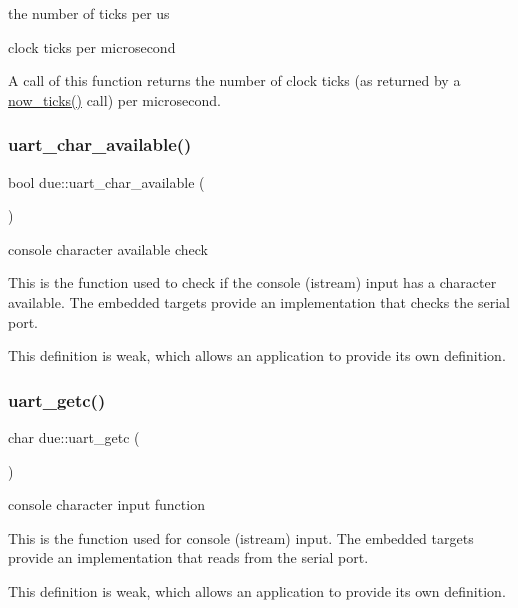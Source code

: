 the number of ticks per us 

clock ticks per microsecond

A call of this function returns the number of clock ticks (as returned by a \hyperlink{namespacedue_a686106c53be24f799ee7313069a678be}{now\+\_\+ticks()} call) per microsecond. \mbox{\label{namespacedue_a3fb7cef33e032624d26b3a94f09974d1}} 
\subsubsection{\texorpdfstring{uart\+\_\+char\+\_\+available()}{uart\_char\_available()}}
{\footnotesize\ttfamily bool due\+::uart\+\_\+char\+\_\+available (\begin{DoxyParamCaption}{ }\end{DoxyParamCaption})}

console character available check

This is the function used to check if the console (istream) input has a character available. The embedded targets provide an implementation that checks the serial port.

This definition is weak, which allows an application to provide its own definition. \mbox{\label{namespacedue_aaac909e6a73b4a5ed65230aad135c277}} 
\subsubsection{\texorpdfstring{uart\+\_\+getc()}{uart\_getc()}}
{\footnotesize\ttfamily char due\+::uart\+\_\+getc (\begin{DoxyParamCaption}{ }\end{DoxyParamCaption})}

console character input function

This is the function used for console (istream) input. The embedded targets provide an implementation that reads from the serial port.

This definition is weak, which allows an application to provide its own definition. \mbox{\label{namespacedue_a4a5e5e08f37cad92092942e5b8898471}} 
